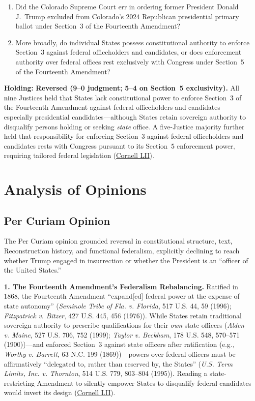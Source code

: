 \documentclass[12pt]{article}
\begin{document}
\begin{enumerate}
  \item Did the Colorado Supreme Court err in ordering former President Donald J.\ Trump excluded from Colorado's 2024 Republican presidential primary ballot under Section~3 of the Fourteenth Amendment?
  \item More broadly, do individual States possess constitutional authority to enforce Section~3 against federal officeholders and candidates, or does enforcement authority over federal offices rest exclusively with Congress under Section~5 of the Fourteenth Amendment?
\end{enumerate}

\textbf{Holding:} \textbf{Reversed (9--0 judgment; 5--4 on Section~5 exclusivity).} All nine Justices held that States lack constitutional power to enforce Section~3 of the Fourteenth Amendment against federal officeholders and candidates---especially presidential candidates---although States retain sovereign authority to disqualify persons holding or seeking \emph{state} office. A five-Justice majority further held that responsibility for enforcing Section~3 against federal officeholders and candidates rests with Congress pursuant to its Section~5 enforcement power, requiring tailored federal legislation (\href{https://www.law.cornell.edu/supremecourt/text/23-719}{Cornell LII}).

\section{Analysis of Opinions}
\subsection{Per Curiam Opinion}

The Per Curiam opinion grounded reversal in constitutional structure, text, Reconstruction history, and functional federalism, explicitly declining to reach whether Trump engaged in insurrection or whether the President is an ``officer of the United States.''

\textbf{1. The Fourteenth Amendment's Federalism Rebalancing.} Ratified in 1868, the Fourteenth Amendment ``expand[ed] federal power at the expense of state autonomy'' (\emph{Seminole Tribe of Fla. v. Florida}, 517 U.S. 44, 59 (1996); \emph{Fitzpatrick v. Bitzer}, 427 U.S. 445, 456 (1976)). While States retain traditional sovereign authority to prescribe qualifications for their \emph{own} state officers (\emph{Alden v. Maine}, 527 U.S. 706, 752 (1999); \emph{Taylor v. Beckham}, 178 U.S. 548, 570--571 (1900))---and enforced Section~3 against state officers after ratification (e.g., \emph{Worthy v. Barrett}, 63 N.C. 199 (1869))---powers over federal officers must be affirmatively ``delegated to, rather than reserved by, the States'' (\emph{U.S. Term Limits, Inc. v. Thornton}, 514 U.S. 779, 803--804 (1995)). Reading a state-restricting Amendment to silently empower States to disqualify federal candidates would invert its design (\href{https://www.law.cornell.edu/supremecourt/text/23-719}{Cornell LII}).
\end{document}
